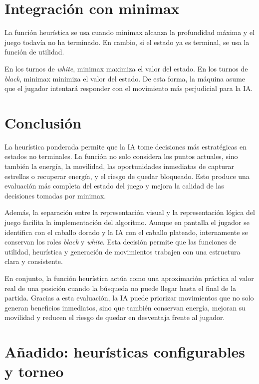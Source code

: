 \documentclass[12pt,letterpaper]{article}
\begin{document}
\section{Integración con minimax}

La función heurística se usa cuando minimax alcanza la profundidad máxima y el juego todavía no ha terminado. En cambio, si el estado ya es terminal, se usa la función de utilidad.

\begin{tcolorbox}[colframe=KEBlue,title=\textbf{Criterio de decisión},coltitle=white,colbacktitle=KEBlue]
En los turnos de \textit{white}, minimax maximiza el valor del estado. En los turnos de \textit{black}, minimax minimiza el valor del estado. De esta forma, la máquina asume que el jugador intentará responder con el movimiento más perjudicial para la IA.
\end{tcolorbox}

\section{Conclusión}

La heurística ponderada permite que la IA tome decisiones más estratégicas en estados no terminales. La función no solo considera los puntos actuales, sino también la energía, la movilidad, las oportunidades inmediatas de capturar estrellas o recuperar energía, y el riesgo de quedar bloqueado. Esto produce una evaluación más completa del estado del juego y mejora la calidad de las decisiones tomadas por minimax.

Además, la separación entre la representación visual y la representación lógica del juego facilita la implementación del algoritmo. Aunque en pantalla el jugador se identifica con el caballo dorado y la IA con el caballo plateado, internamente se conservan los roles \textit{black} y \textit{white}. Esta decisión permite que las funciones de utilidad, heurística y generación de movimientos trabajen con una estructura clara y consistente.

En conjunto, la función heurística actúa como una aproximación práctica al valor real de una posición cuando la búsqueda no puede llegar hasta el final de la partida. Gracias a esta evaluación, la IA puede priorizar movimientos que no solo generan beneficios inmediatos, sino que también conservan energía, mejoran su movilidad y reducen el riesgo de quedar en desventaja frente al jugador.

\section{Añadido: heurísticas configurables y torneo}
\end{document}
